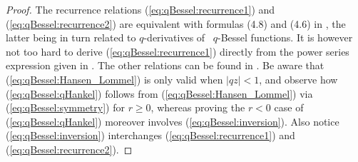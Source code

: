 \begin{proof}
The recurrence relations (\ref{eq:qBessel:recurrence1}) and (\ref{eq:qBessel:recurrence2})
are equivalent with formulas (4.8) and (4.6) in
\cite{KoelinkSwart:qBessel:zeros}, the latter being in turn
related to $q$-derivatives of \little\ $q$-Bessel functions.
It is however not too hard to derive (\ref{eq:qBessel:recurrence1})
directly from the power series expression given in
\cite[proof of prop.\ 2.1]{KoornwSwartt}\@.
The other relations can be found in
\cite{Koelink:thesis,Koelink:QE2,KoornwSwartt,Swarttouw}\@.
Be aware that (\ref{eq:qBessel:Hansen_Lommel}) is only valid when
$|qz|<1$, and observe how (\ref{eq:qBessel:qHankel})
follows from (\ref{eq:qBessel:Hansen_Lommel}) via
(\ref{eq:qBessel:symmetry}) for $r\geq 0$, whereas proving the $r<0$ case of
(\ref{eq:qBessel:qHankel}) moreover involves (\ref{eq:qBessel:inversion}).
Also notice (\ref{eq:qBessel:inversion}) interchanges
(\ref{eq:qBessel:recurrence1}) and (\ref{eq:qBessel:recurrence2}).
\end{proof}
